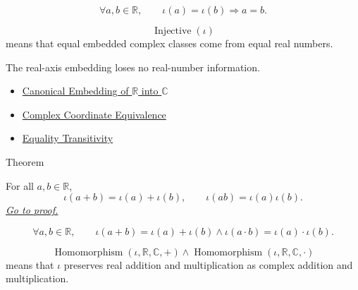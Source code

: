 \begin{remark*}
\[
\forall a,b\in\mathbb{R},\qquad
\iota(a)=\iota(b)\Longrightarrow a=b.
\]
\end{remark*}

\begin{remark*}
\[
\operatorname{Injective}(\iota)
\]
means that equal embedded complex classes come from equal real numbers.
\end{remark*}

\begin{remark*}[Interpretation]
The real-axis embedding loses no real-number information.
\end{remark*}

\begin{dependencies}
\begin{itemize}
  \item \hyperref[def:canonical-embedding-r-into-c]{Canonical Embedding of $\mathbb{R}$ into $\mathbb{C}$}
  \item \hyperref[def:complex-coordinate-equivalence]{Complex Coordinate Equivalence}
  \item \hyperref[thm:equality-transitivity]{Equality Transitivity}
\end{itemize}
\end{dependencies}

\begin{theorembox}{Theorem}
\begin{theorem}
\label{thm:embedding-r-into-c-preserves-operations}
For all \(a,b\in\mathbb{R}\),
\[
\iota(a+b)=\iota(a)+\iota(b),
\qquad
\iota(ab)=\iota(a)\iota(b).
\]
\hyperref[prf:embedding-r-into-c-preserves-operations]{\textit{Go to proof.}}
\end{theorem}
\end{theorembox}


\begin{remark*}
\[
\forall a,b\in\mathbb{R},\qquad
\iota(a+b)=\iota(a)+\iota(b)
\land
\iota(a\cdot b)=\iota(a)\cdot\iota(b).
\]
\end{remark*}

\begin{remark*}
\[
\operatorname{Homomorphism}(\iota,\mathbb{R},\mathbb{C},+)
\land
\operatorname{Homomorphism}(\iota,\mathbb{R},\mathbb{C},\cdot)
\]
means that $\iota$ preserves real addition and multiplication as complex addition and multiplication.
\end{remark*}

